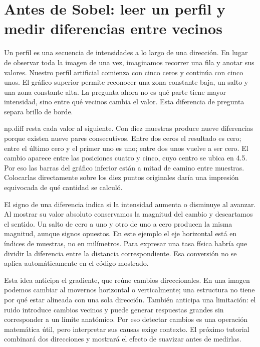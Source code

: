 \section{Antes de Sobel: leer un perfil y medir diferencias entre vecinos}


Un perfil es una secuencia de intensidades a lo largo de una dirección. En lugar de observar toda la imagen de una vez, imaginamos recorrer una fila y anotar sus valores. Nuestro perfil artificial comienza con cinco ceros y continúa con cinco unos. El gráfico superior permite reconocer una zona constante baja, un salto y una zona constante alta. La pregunta ahora no es qué parte tiene mayor intensidad, sino entre qué vecinos cambia el valor. Esta diferencia de pregunta separa brillo de borde.


np.diff resta cada valor al siguiente. Con diez muestras produce nueve diferencias porque existen nueve pares consecutivos. Entre dos ceros el resultado es cero; entre el último cero y el primer uno es uno; entre dos unos vuelve a ser cero. El cambio aparece entre las posiciones cuatro y cinco, cuyo centro se ubica en 4.5. Por eso las barras del gráfico inferior están a mitad de camino entre muestras. Colocarlas directamente sobre los diez puntos originales daría una impresión equivocada de qué cantidad se calculó.


El signo de una diferencia indica si la intensidad aumenta o disminuye al avanzar. Al mostrar su valor absoluto conservamos la magnitud del cambio y descartamos el sentido. Un salto de cero a uno y otro de uno a cero producen la misma magnitud, aunque signos opuestos. En este ejemplo el eje horizontal está en índices de muestras, no en milímetros. Para expresar una tasa física habría que dividir la diferencia entre la distancia correspondiente. Esa conversión no se aplica automáticamente en el código mostrado.


Esta idea anticipa el gradiente, que reúne cambios direccionales. En una imagen podemos cambiar al movernos horizontal o verticalmente; una estructura no tiene por qué estar alineada con una sola dirección. También anticipa una limitación: el ruido introduce cambios vecinos y puede generar respuestas grandes sin corresponder a un límite anatómico. Por eso detectar cambios es una operación matemática útil, pero interpretar sus causas exige contexto. El próximo tutorial combinará dos direcciones y mostrará el efecto de suavizar antes de medirlas.


